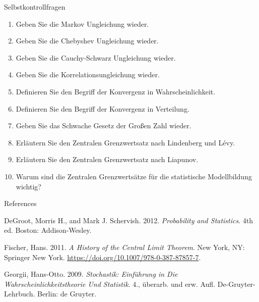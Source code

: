 \documentclass[
  8pt,
  ignorenonframetext,
]{beamer}
\newlength{\cslhangindent}
\newlength{\cslentryspacingunit} %
\newenvironment{CSLReferences}[2] %
 {%
  \setlength{\parindent}{0pt}
  \ifodd #1
  \let\oldpar\par
  \def\par{\hangindent=\cslhangindent\oldpar}
  \fi
  \setlength{\parskip}{#2\cslentryspacingunit}
 }%
 {}
\begin{document}
\begin{frame}{Selbstkontrollfragen}
\protect\hypertarget{selbstkontrollfragen}{}
\small
\begin{enumerate}
\item Geben Sie die Markov Ungleichung wieder.
\item Geben Sie die Chebyshev Ungleichung wieder.
\item Geben Sie die Cauchy-Schwarz Ungleichung wieder.
\item Geben Sie die Korrelationsungleichung wieder.
\item Definieren Sie den Begriff der Konvergenz in Wahrscheinlichkeit.
\item Definieren Sie den Begriff der Konvergenz in Verteilung.
\item Geben Sie das Schwache Gesetz der Großen Zahl wieder.
\item Erläutern Sie den Zentralen Grenzwertsatz nach Lindenberg und Lévy.
\item Erläutern Sie den Zentralen Grenzwertsatz nach Liapunov.
\item Warum sind die Zentralen Grenzwertsätze für die statistische Modellbildung wichtig?
\end{enumerate}
\end{frame}

\begin{frame}{References}
\protect\hypertarget{references}{}
\footnotesize

\hypertarget{refs}{}
\begin{CSLReferences}{1}{0}
\leavevmode{}%
DeGroot, Morris H., and Mark J. Schervish. 2012. \emph{Probability and
Statistics}. 4th ed. Boston: Addison-Wesley.

\leavevmode{}%
Fischer, Hans. 2011. \emph{A {History} of the {Central} {Limit}
{Theorem}}. New York, NY: Springer New York.
\url{https://doi.org/10.1007/978-0-387-87857-7}.

\leavevmode{}%
Georgii, Hans-Otto. 2009. \emph{Stochastik: {Einführung} in Die
{Wahrscheinlichkeitstheorie} Und {Statistik}}. 4., überarb. und erw.
Aufl. De-{Gruyter}-{Lehrbuch}. Berlin: de Gruyter.

\end{CSLReferences}
\end{frame}
\end{document}
